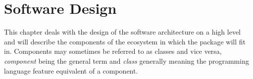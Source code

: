 \chapter{Software Design}
\label{chapter:04}
This chapter deals with the design of the software architecture on a high level and will describe the components of the ecosystem in which the package will fit in. Components may sometimes be referred to as classes and vice versa, \textit{component} being the general term and \textit{class} generally meaning the programming language feature equivalent of a component.





